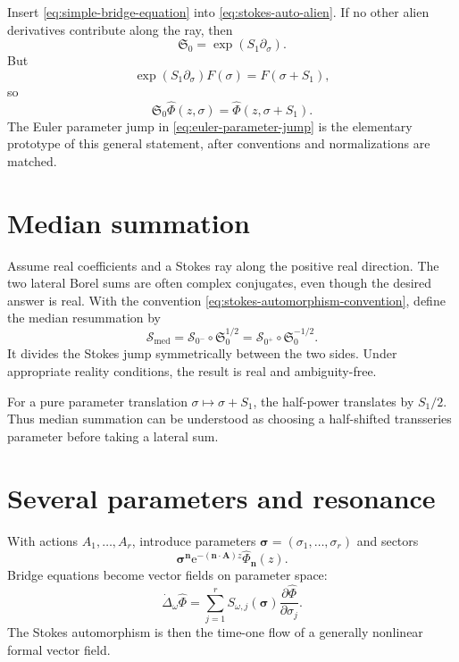 \documentclass[11pt,oneside]{book}
\theoremstyle{definition}
\theoremstyle{remark}
\newcommand{\e}{\mathrm{e}}
\newcommand{\compose}{\mathbin{\circ}}
\newcommand{\phihat}{\widehat{\Phi}}
\begin{document}
Insert \eqref{eq:simple-bridge-equation} into
\eqref{eq:stokes-auto-alien}. If no other alien derivatives contribute along
the ray, then
\[
  \mathfrak S_0
  =\exp(S_1\partial_\sigma).
\]
But
\[
  \exp(S_1\partial_\sigma)F(\sigma)=F(\sigma+S_1),
\]
so
\begin{equation}
  \mathfrak S_0\widehat\Phi(z,\sigma)
  =\widehat\Phi(z,\sigma+S_1).
  \label{eq:stokes-parameter-translation}
\end{equation}
The Euler parameter jump in \eqref{eq:euler-parameter-jump} is the elementary
prototype of this general statement, after conventions and normalizations are
matched.

\section{Median summation}

Assume real coefficients and a Stokes ray along the positive real direction.
The two lateral Borel sums are often complex conjugates, even though the desired
answer is real. With the convention
\eqref{eq:stokes-automorphism-convention}, define the median resummation by
\begin{equation}
  \mathcal S_{\mathrm{med}}
  =\mathcal S_{0^-}\compose\mathfrak S_0^{1/2}
  =\mathcal S_{0^+}\compose\mathfrak S_0^{-1/2}.
  \label{eq:median-resummation}
\end{equation}
It divides the Stokes jump symmetrically between the two sides. Under appropriate
reality conditions, the result is real and ambiguity-free.

For a pure parameter translation $\sigma\mapsto\sigma+S_1$, the half-power
translates by $S_1/2$. Thus median summation can be understood as choosing a
half-shifted transseries parameter before taking a lateral sum.

\section{Several parameters and resonance}

With actions $A_1,\ldots,A_r$, introduce parameters
$\bm\sigma=(\sigma_1,\ldots,\sigma_r)$ and sectors
\[
  \bm\sigma^{\bm n}
  \e^{-(\bm n\cdot\bm A)z}\phihat_{\bm n}(z).
\]
Bridge equations become vector fields on parameter space:
\begin{equation}
  \dot\Delta_\omega\widehat\Phi
  =\sum_{j=1}^r
    S_{\omega,j}(\bm\sigma)
    \frac{\partial\widehat\Phi}{\partial\sigma_j}.
  \label{eq:multivariate-bridge}
\end{equation}
The Stokes automorphism is then the time-one flow of a generally nonlinear
formal vector field.
\end{document}
